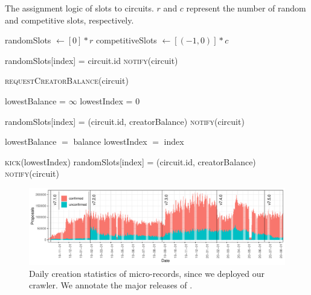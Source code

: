 \begin{algorithm}[t]
	\label{alg:slot_logic}
	\caption{The assignment logic of slots to circuits. $ r $ and $ c $ represent the number of random and competitive slots, respectively.}
	\begin{algorithmic}[1]
		\State randomSlots $ \leftarrow [0] * r $ 
		\State competitiveSlots $ \leftarrow [(-1, 0)] * c $ 
		\State
		
		\State randomSlots[index] = circuit.id
		\State \textsc{notify}(circuit)
		\State \Return
		\EndIf
		\EndFor
		
		\State \textsc{requestCreatorBalance}(circuit)
		
		\EndFunction
		\State
		
		\State lowestBalance = $ \infty $
		\State lowestIndex = 0
		
		 
		\State randomSlots[index] = (circuit.id, creatorBalance)
		\State \textsc{notify}(circuit)
		\State \Return
		\EndIf
		
		\State lowestBalance $ = $ balance
		\State lowestIndex $ = $ index
		\EndIf
		\EndFor
		
		\State \textsc{kick}(lowestIndex)
		\State randomSlots[index] = (circuit.id, creatorBalance)
		\State \textsc{notify}(circuit)
		\State \Return
		\EndIf
		
		\EndFunction
		
	\end{algorithmic}
\end{algorithm}

\begin{figure}[t]
	\centering
	\includegraphics[width=\linewidth]{trustchain/assets/record_creation}
	\caption{Daily creation statistics of micro-records, since we deployed our \ModelName{} crawler. We annotate the major releases of \Tribler{}.}
	\label{fig:record_creation}
\end{figure}

